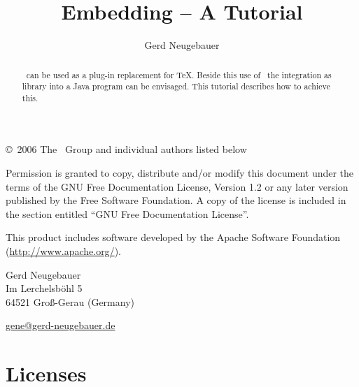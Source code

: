 \documentclass{extex-doc}
\begin{document}

\begin{titlepage}\parindent=0pt

  \title{Embedding \ExTeX{} -- A Tutorial}
  \author{Gerd Neugebauer}
  \maketitle

  \begin{center}
    \begin{abstract}\parindent=0pt
      \ExTeX\ can be used as a plug-in replacement for \TeX. Beside
      this use of \ExTeX\ the integration as library into a Java
      program can be envisaged. This tutorial describes how to achieve
      this. 
    \end{abstract}
  \end{center}
  \newpage
  \footnotesize
  \copyright\ 2006 The \ExTeX\ Group and individual authors listed below
  \medskip

Permission is granted to copy, distribute and/or modify this document
under the terms of the GNU Free Documentation License, Version 1.2 or
any later version published by the Free Software Foundation. A copy of
the license is included in the section entitled ``GNU Free
Documentation License''.
\bigskip

This product includes software developed by the Apache Software
Foundation (\url{http://www.apache.org/}).

\vfill

Gerd Neugebauer\\
Im Lerchelsb\"ohl 5\\
64521 Gro\ss-Gerau (Germany)
\smallskip

\href{mailto://gene@gerd-neugebauer.de}{gene@gerd-neugebauer.de}
\end{titlepage}

\tableofcontents
\newpage





\appendix
\chapter{Licenses}


\printindex
\end{document}
